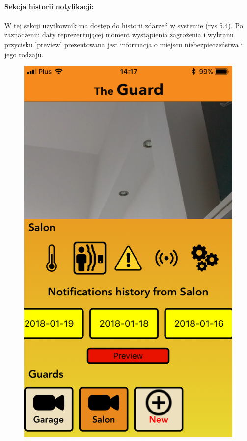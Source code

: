 \paragraph{Sekcja historii notyfikacji:}
W tej sekcji użytkownik ma dostęp do historii zdarzeń w systemie (rys 5.4). Po zaznaczeniu daty reprezentującej moment wystąpienia zagrożenia i wybranu przycisku 'preview' prezentowana jest informacja o miejscu niebezpieczeństwa i jego rodzaju. 
\begin{figure}[h]
\centering
\begin{minipage}{.4\linewidth}
    \includegraphics[width=\linewidth]{history.png}

\end{minipage}
\end{figure}
